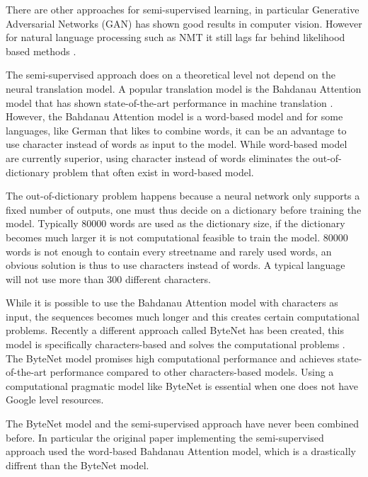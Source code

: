 There are other approaches for semi-supervised learning, in particular Generative Adversarial Networks (GAN) has shown good results in computer vision. However for natural language processing such as NMT it still lags far behind likelihood based methods \cite{gan-on-nlp}.

The semi-supervised approach does on a theoretical level not depend on the neural translation model. A popular translation model is the Bahdanau Attention model that has shown state-of-the-art performance in machine translation \cite{bahdanau-2015-nmt}. However, the Bahdanau Attention model is a word-based model and for some languages, like German that likes to combine words, it can be an advantage to use character instead of words as input to the model. While word-based model are currently superior, using character instead of words eliminates the out-of-dictionary problem that often exist in word-based model.

The out-of-dictionary problem happens because a neural network only supports a fixed number of outputs, one must thus decide on a dictionary before training the model. Typically 80000 words are used as the dictionary size, if the dictionary becomes much larger it is not computational feasible to train the model. 80000 words is not enough to contain every streetname and rarely used words, an obvious solution is thus to use characters instead of words. A typical language will not use more than 300 different characters.

While it is possible to use the Bahdanau Attention model with characters as input, the sequences becomes much longer and this creates certain computational problems. Recently a different approach called ByteNet has been created, this model is specifically characters-based and solves the computational problems \cite{bytenet}. The ByteNet model promises high computational performance and achieves state-of-the-art performance compared to other characters-based models. Using a computational pragmatic model like ByteNet is essential when one does not have Google level resources.

The ByteNet model and the semi-supervised approach have never been combined before. In particular the original paper implementing the semi-supervised approach used the word-based Bahdanau Attention model, which is a drastically diffrent than the ByteNet model.


